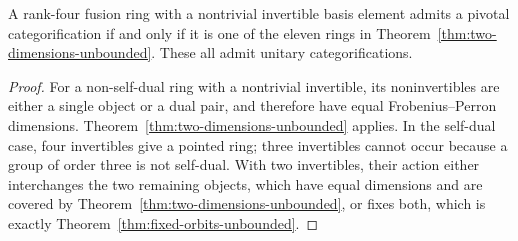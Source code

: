 \begin{corollary}\label{cor:nontrivial-invertible-unbounded}
A rank-four fusion ring with a nontrivial invertible basis element admits
a pivotal categorification if and only if it is one of the eleven rings
in Theorem~\ref{thm:two-dimensions-unbounded}. These all admit unitary
categorifications.
\end{corollary}
\begin{proof}
For a non-self-dual ring with a nontrivial invertible, its noninvertibles
are either a single object or a dual pair, and therefore have equal
Frobenius--Perron dimensions. Theorem~\ref{thm:two-dimensions-unbounded}
applies. In the self-dual case, four invertibles give a pointed ring;
three invertibles cannot occur because a group of order three is not
self-dual. With two invertibles, their action either interchanges the two
remaining objects, which have equal dimensions and are covered by
Theorem~\ref{thm:two-dimensions-unbounded}, or fixes both, which is exactly
Theorem~\ref{thm:fixed-orbits-unbounded}.
\end{proof}
